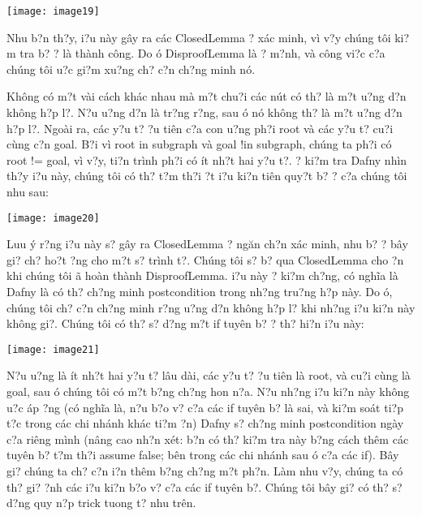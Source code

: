 \documentclass{article} %
\begin{document}
\noindent \texttt{[image: image19]}

Nhu b?n th?y, {\dj}i?u n\`{a}y g\^{a}y ra c\'{a}c ClosedLemma {\dj}? x\'{a}c minh, v\`{i} v?y ch\'{u}ng t\^{o}i ki?m tra b? {\dj}? l\`{a} th\`{a}nh c\^{o}ng. Do {\dj}\'{o} DisproofLemma l\`{a} {\dj}? m?nh, v\`{a} c\^{o}ng vi?c c?a ch\'{u}ng t\^{o}i {\dj}u?c gi?m xu?ng ch? c?n ch?ng minh n\'{o}.

Kh\^{o}ng c\'{o} m?t v\`{a}i c\'{a}ch kh\'{a}c nhau m\`{a} m?t chu?i c\'{a}c n\'{u}t c\'{o} th? l\`{a} m?t {\dj}u?ng d?n kh\^{o}ng h?p l?. N?u {\dj}u?ng d?n l\`{a} tr?ng r?ng, sau {\dj}\'{o} n\'{o} kh\^{o}ng th? l\`{a} m?t {\dj}u?ng d?n h?p l?. Ngo\`{a}i ra, c\'{a}c y?u t? {\dj}?u ti\^{e}n c?a con {\dj}u?ng ph?i root v\`{a} c\'{a}c y?u t? cu?i c\`{u}ng c?n goal. B?i v\`{i} root in subgraph v\`{a} goal !in subgraph, ch\'{u}ng ta ph?i c\'{o} root != goal, v\`{i} v?y, ti?n tr\`{i}nh ph?i c\'{o} \'{i}t nh?t hai y?u t?. {\DJ}? ki?m tra Dafny nh\`{i}n th?y {\dj}i?u n\`{a}y, ch\'{u}ng t\^{o}i c\'{o} th? t?m th?i {\dj}?t {\dj}i?u ki?n ti\^{e}n quy?t b? {\dj}? c?a ch\'{u}ng t\^{o}i nhu sau:

\noindent \texttt{[image: image20]}

Luu \'{y} r?ng {\dj}i?u n\`{a}y s? g\^{a}y ra ClosedLemma {\dj}? ng\u{a}n ch?n x\'{a}c minh, nhu b? {\dj}? b\^{a}y gi? ch? ho?t {\dj}?ng cho m?t s? tr\`{i}nh t?. Ch\'{u}ng t\^{o}i s? b? qua ClosedLemma cho {\dj}?n khi ch\'{u}ng t\^{o}i {\dj}\~{a} ho\`{a}n th\`{a}nh DisproofLemma. {\DJ}i?u n\`{a}y {\dj}? ki?m ch?ng, c\'{o} ngh\~{i}a l\`{a} Dafny l\`{a} c\'{o} th? ch?ng minh postcondition trong nh?ng tru?ng h?p n\`{a}y. Do {\dj}\'{o}, ch\'{u}ng t\^{o}i ch? c?n ch?ng minh r?ng {\dj}u?ng d?n kh\^{o}ng h?p l? khi nh?ng {\dj}i?u ki?n n\`{a}y kh\^{o}ng gi?. Ch\'{u}ng t\^{o}i c\'{o} th? s? d?ng m?t if tuy\^{e}n b? {\dj}? th? hi?n {\dj}i?u n\`{a}y:

\noindent \texttt{[image: image21]}

N?u {\dj}u?ng l\`{a} \'{i}t nh?t hai y?u t? l\^{a}u d\`{a}i, c\'{a}c y?u t? {\dj}?u ti\^{e}n l\`{a} root, v\`{a} cu?i c\`{u}ng l\`{a} goal, sau {\dj}\'{o} ch\'{u}ng t\^{o}i c\'{o} m?t b?ng ch?ng hon n?a. N?u nh?ng {\dj}i?u ki?n n\`{a}y kh\^{o}ng {\dj}u?c {\dj}\'{a}p ?ng (c\'{o} ngh\~{i}a l\`{a}, n?u b?o v? c?a c\'{a}c if tuy\^{e}n b? l\`{a} sai, v\`{a} ki?m so\'{a}t ti?p t?c trong c\'{a}c chi nh\'{a}nh kh\'{a}c ti?m ?n) Dafny s? ch?ng minh postcondition ng\`{a}y c?a ri\^{e}ng m\`{i}nh (n\^{a}ng cao nh?n x\'{e}t: b?n c\'{o} th? ki?m tra n\`{a}y b?ng c\'{a}ch th\^{e}m c\'{a}c tuy\^{e}n b? t?m th?i assume false; b\^{e}n trong c\'{a}c chi nh\'{a}nh sau {\dj}\'{o} c?a c\'{a}c if). B\^{a}y gi? ch\'{u}ng ta ch? c?n {\dj}i?n th\^{e}m b?ng ch?ng m?t ph?n. L\`{a}m nhu v?y, ch\'{u}ng ta c\'{o} th? gi? {\dj}?nh c\'{a}c {\dj}i?u ki?n b?o v? c?a c\'{a}c if tuy\^{e}n b?. Ch\'{u}ng t\^{o}i b\^{a}y gi? c\'{o} th? s? d?ng quy n?p trick tuong t? nhu tr\^{e}n.
\end{document}
